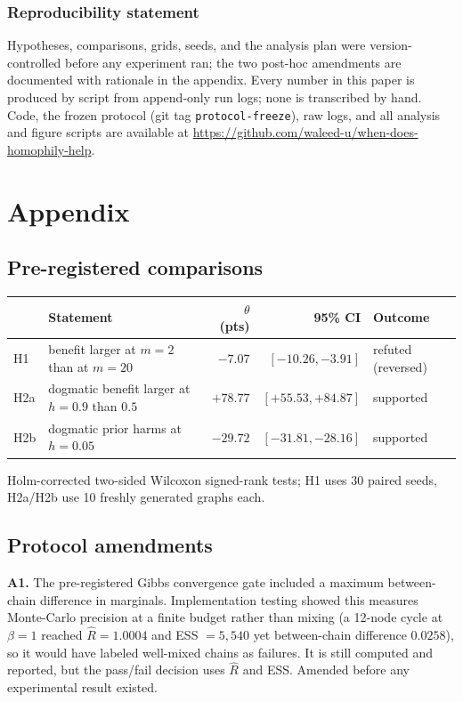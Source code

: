 \documentclass{article}
\begin{document}
\subsubsection*{Reproducibility statement}

Hypotheses, comparisons, grids, seeds, and the analysis plan were version-controlled before any
experiment ran; the two post-hoc amendments are documented with rationale in the appendix.
Every number in this paper is produced by script from append-only run logs; none is transcribed
by hand. Code, the frozen protocol (git tag \texttt{protocol-freeze}), raw logs, and all
analysis and figure scripts are available at \url{https://github.com/waleed-u/when-does-homophily-help}.




\appendix
\section{Appendix}

\subsection{Pre-registered comparisons}

\begin{center}
\small
\begin{tabular}{llrrl}
\toprule
& Statement & $\theta$ (pts) & 95\% CI & Outcome \\
\midrule
H1 & benefit larger at $m{=}2$ than at $m{=}20$ & $-7.07$ & $[-10.26,-3.91]$ & refuted (reversed) \\
H2a & dogmatic benefit larger at $h{=}0.9$ than $0.5$ & $+78.77$ & $[+55.53,+84.87]$ & supported \\
H2b & dogmatic prior harms at $h{=}0.05$ & $-29.72$ & $[-31.81,-28.16]$ & supported \\
\bottomrule
\end{tabular}
\end{center}
Holm-corrected two-sided Wilcoxon signed-rank tests; H1 uses 30 paired seeds, H2a/H2b use 10
freshly generated graphs each.

\subsection{Protocol amendments}

\textbf{A1.} The pre-registered Gibbs convergence gate included a maximum between-chain
difference in marginals. Implementation testing showed this measures Monte-Carlo precision at a
finite budget rather than mixing (a 12-node cycle at $\beta{=}1$ reached $\hat{R}=1.0004$ and
ESS $=5{,}540$ yet between-chain difference $0.0258$), so it would have labeled well-mixed
chains as failures. It is still computed and reported, but the pass/fail decision uses
$\hat{R}$ and ESS. Amended before any experimental result existed.
\end{document}
